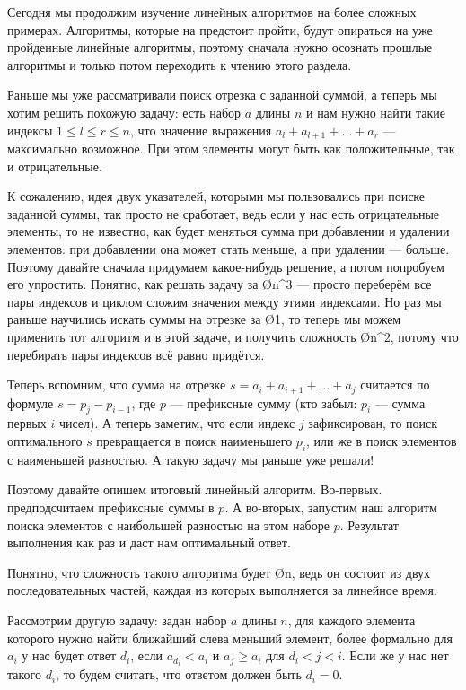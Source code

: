 Сегодня мы продолжим изучение линейных алгоритмов на более сложных примерах. Алгоритмы, которые на предстоит пройти, будут опираться на уже пройденные линейные алгоритмы, поэтому сначала нужно осознать прошлые алгоритмы и только потом переходить к чтению этого раздела.


Раньше мы уже рассматривали поиск отрезка с заданной суммой, а теперь мы хотим решить похожую задачу: есть набор $a$ длины $n$ и нам нужно найти такие индексы $1 \leq l \leq r \leq n$, что значение выражения $a_l + a_{l + 1} + \ldots + a_r$ — максимально возможное. При этом элементы могут быть как положительные, так и отрицательные. 

К сожалению, идея двух указателей, которыми мы пользовались при поиске заданной суммы, так просто не сработает, ведь если у нас есть отрицательные элементы, то не известно, как будет меняться сумма при добавлении и удалении элементов: при добавлении она может стать меньше, а при удалении — больше. Поэтому давайте сначала придумаем какое-нибудь решение, а потом попробуем его упростить. Понятно, как решать задачу за \O{n^3} — просто переберём все пары индексов и циклом сложим значения между этими индексами. Но раз мы раньше научились искать суммы на отрезке за \O{1}, то теперь мы можем применить тот алгоритм и в этой задаче, и получить сложность \O{n^2}, потому что перебирать пары индексов всё равно придётся.

Теперь вспомним, что сумма на отрезке $s = a_i + a_{i + 1} + \ldots + a_j$ считается по формуле $s = p_j - p_{i - 1}$, где $p$ — префиксные сумму (кто забыл: $p_i$ — сумма первых $i$ чисел). А теперь заметим, что если индекс $j$ зафиксирован, то поиск оптимального $s$ превращается в поиск наименьшего $p_i$, или же в поиск элементов с наименьшей разностью. А такую задачу мы раньше уже решали!

Поэтому давайте опишем итоговый линейный алгоритм. Во-первых. предподсчитаем префиксные суммы в $p$. А во-вторых, запустим наш алгоритм поиска элементов с наибольшей разностью на этом наборе $p$. Результат выполнения как раз и даст нам оптимальный ответ.

Понятно, что сложность такого алгоритма будет \O{n}, ведь он состоит из двух последовательных частей, каждая из которых выполняется за линейное время.


Рассмотрим другую задачу: задан набор $a$ длины $n$, для каждого элемента которого нужно найти ближайший слева меньший элемент, более формально для $a_i$ у нас будет ответ $d_i$, если $a_{d_i} < a_i$ и $a_j \geq a_i$ для $d_i < j < i$. Если же у нас нет такого $d_i$, то будем считать, что ответом должен быть $d_i = 0$.

